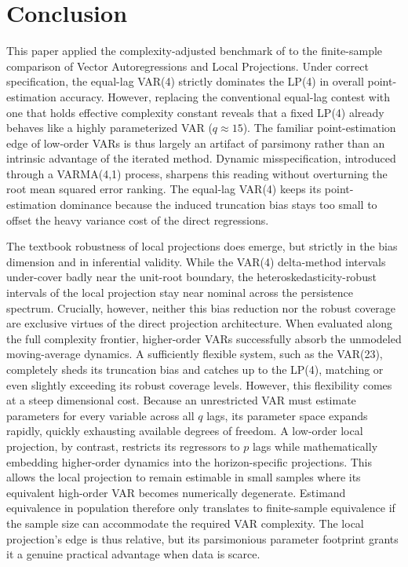 \section{Conclusion}

This paper applied the complexity-adjusted benchmark of \textcite{ludwig2026local} to the finite-sample comparison of Vector Autoregressions and Local Projections. Under correct specification, the equal-lag VAR(4) strictly dominates the LP(4) in overall point-estimation accuracy. However, replacing the conventional equal-lag contest with one that holds effective complexity constant reveals that a fixed LP(4) already behaves like a highly parameterized VAR ($q \approx 15$). The familiar point-estimation edge of low-order VARs is thus largely an artifact of parsimony rather than an intrinsic advantage of the iterated method. Dynamic misspecification, introduced through a VARMA(4,1) process, sharpens this reading without overturning the root mean squared error ranking. The equal-lag VAR(4) keeps its point-estimation dominance because the induced truncation bias stays too small to offset the heavy variance cost of the direct regressions.

The textbook robustness of local projections does emerge, but strictly in the bias dimension and in inferential validity. While the VAR(4) delta-method intervals under-cover badly near the unit-root boundary, the heteroskedasticity-robust intervals of the local projection stay near nominal across the persistence spectrum. Crucially, however, neither this bias reduction nor the robust coverage are exclusive virtues of the direct projection architecture. When evaluated along the full complexity frontier, higher-order VARs successfully absorb the unmodeled moving-average dynamics. A sufficiently flexible system, such as the VAR(23), completely sheds its truncation bias and catches up to the LP(4), matching or even slightly exceeding its robust coverage levels. However, this flexibility comes at a steep dimensional cost. Because an unrestricted VAR must estimate parameters for every variable across all $q$ lags, its parameter space expands rapidly, quickly exhausting available degrees of freedom. A low-order local projection, by contrast, restricts its regressors to $p$ lags while mathematically embedding higher-order dynamics into the horizon-specific projections. This allows the local projection to remain estimable in small samples where its equivalent high-order VAR becomes numerically degenerate. Estimand equivalence in population therefore only translates to finite-sample equivalence if the sample size can accommodate the required VAR complexity. The local projection's edge is thus relative, but its parsimonious parameter footprint grants it a genuine practical advantage when data is scarce.

